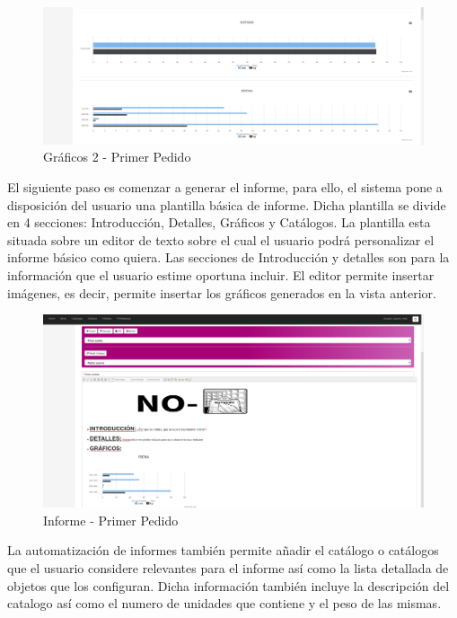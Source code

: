 \documentclass[a4paper,11pt]{book}
\begin{document}
\begin{figure}[H] 
\centering 
\includegraphics[scale=0.2]{imagenes/pruebas/g2.png}
\caption{ Gráficos 2 - Primer Pedido\cite{propio}}
\end{figure}

El siguiente paso es comenzar a generar el informe, para ello, el sistema pone a disposición del usuario una plantilla básica de informe. Dicha plantilla se divide en 4 secciones: Introducción, Detalles, Gráficos y Catálogos. La plantilla esta situada sobre un editor de texto sobre el cual el usuario podrá personalizar el informe básico como quiera. Las secciones de Introducción y detalles son para la información que el usuario estime oportuna incluir. 
El editor permite insertar imágenes, es decir, permite insertar los gráficos generados en la vista anterior.

\begin{figure}[H] 
\centering 
\includegraphics[scale=0.2]{imagenes/pruebas/informe_1.png}
\caption{ Informe - Primer Pedido\cite{propio}}
\end{figure}

La automatización de informes también permite añadir el catálogo o catálogos que el usuario considere relevantes para el informe así como la lista detallada de objetos que los configuran. Dicha información también incluye la descripción del catalogo así como el numero de unidades que contiene y el peso de las mismas.  
\end{document}
